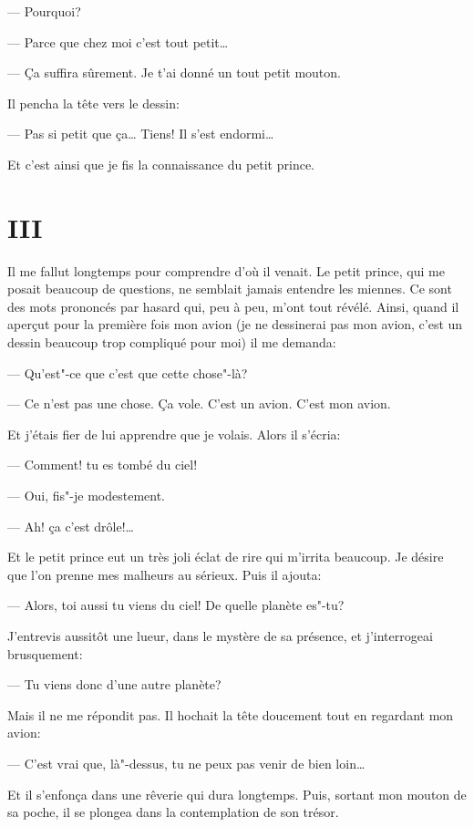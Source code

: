 \begin{Parallel}[p]{}{}
{--- Pourquoi?

--- Parce que chez moi c'est tout petit\ldots{}

--- Ça suffira sûrement. Je t'ai donné un tout
petit mouton.

Il pencha la tête vers le dessin:

--- Pas si petit que ça\ldots{} Tiens! Il s'est endormi\ldots{}

Et c'est ainsi que je fis la connaissance du petit
prince.

\medskip

\section{III}

Il me fallut longtemps pour comprendre d'où il
venait. Le petit prince, qui me posait beaucoup de
questions, ne semblait jamais entendre les miennes.
Ce sont des mots prononcés par hasard qui, peu à
peu, m'ont tout révélé. Ainsi, quand il aperçut
pour la première fois mon avion (je ne dessinerai
pas mon avion, c'est un dessin beaucoup trop
compliqué pour moi) il me demanda:

--- Qu'est"-ce que c'est que cette chose"-là?

--- Ce n'est pas une chose. Ça vole. C'est un avion. C'est mon avion.
 
Et j’étais fier de lui apprendre que je volais. Alors il
s'écria:

--- Comment! tu es tombé du ciel!

--- Oui, fis"-je modestement.

--- Ah! ça c'est drôle!\ldots{}

Et le petit prince eut un très joli éclat de rire qui
m'irrita beaucoup. Je désire que l'on prenne mes
malheurs au sérieux. Puis il ajouta:

--- Alors, toi aussi tu viens du ciel! De quelle planète es"-tu?

J'entrevis aussitôt une lueur, dans le mystère de sa
présence, et j'interrogeai brusquement:

--- Tu viens donc d'une autre planète?

Mais il ne me répondit pas. Il hochait la tête doucement tout en regardant mon avion:

--- C'est vrai que, là"-dessus, tu ne peux pas venir de
bien loin\ldots{}

Et il s'enfonça dans une rêverie qui dura longtemps. Puis, sortant mon mouton de sa poche, il se
plongea dans la contemplation de son trésor.

}
\end{Parallel}
